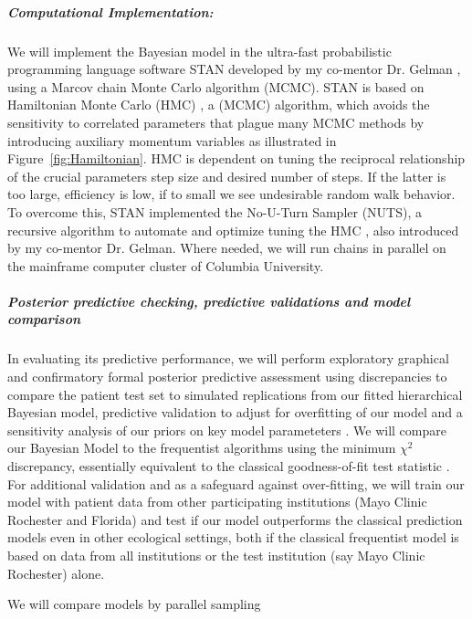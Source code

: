\documentclass[11pt,notitlepage]{article}
\begin{document}
\subparagraph*{Computational Implementation:}
We will implement the Bayesian model in the ultra-fast probabilistic programming language software STAN developed by my co-mentor Dr. Gelman \cite{Stan_Software_2014}, using a Marcov chain Monte Carlo algorithm (MCMC). STAN  is based on Hamiltonian Monte Carlo (HMC) \cite{Gelman-Hill_2014}, a (MCMC) algorithm, which avoids the sensitivity to correlated parameters that plague many MCMC methods by introducing auxiliary momentum variables \cite{Homan_Gelman_NUTS_2014} as illustrated in Figure~\ref{fig:Hamiltonian}. HMC is dependent  on tuning the reciprocal relationship of the crucial parameters step size and desired number of steps. If the latter is too large, efficiency is low, if to small we see undesirable random walk behavior. To overcome this, STAN implemented the No-U-Turn Sampler (NUTS), a recursive algorithm to automate and optimize tuning the HMC \cite{Homan_Gelman_NUTS_2014}, also introduced by my co-mentor Dr. Gelman. Where needed, we will run chains in parallel on the mainframe computer cluster of Columbia University.




\subparagraph*{Posterior predictive checking, predictive validations and model comparison}
In evaluating its predictive performance, we will perform exploratory graphical \cite{Gelman2004posteriorpredictivechecks} and confirmatory formal posterior predictive assessment using discrepancies \cite{GelmanMengStern1996} to compare the patient test set to simulated replications from our fitted hierarchical Bayesian model, predictive validation to adjust for overfitting of our model and a sensitivity analysis of our priors on key model parameteters \cite{Gelman-Hill_2014,Gelman_predictive_2000}. We will compare our Bayesian Model to the frequentist algorithms using the minimum $\chi^{2}$ discrepancy, essentially equivalent to the classical
goodness-of-fit test statistic \cite{GelmanMengStern1996}. For additional validation and as a safeguard against over-fitting, we will train our model with patient data from other participating institutions (Mayo Clinic Rochester and Florida) and test if our model outperforms the classical prediction models even in other ecological settings, both if the classical frequentist model is based on data from all institutions or the test institution (say Mayo Clinic Rochester) alone.

We will compare models by parallel sampling \cite{Congdon_modelcomparison_2005}
\end{document}
